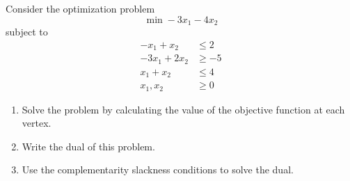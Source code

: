 
 Consider the optimization problem $$\min -3x_1 - 4x_2$$ subject to
\begin{align*}
-x_1+x_2 & \leq 2\\
-3x_1+2x_2 & \geq -5\\
x_1+x_2 & \leq 4\\
x_1,x_2 & \geq 0
\end{align*}
\begin{enumerate}
\item Solve the problem by calculating the  value of the objective
  function at each vertex.
\item Write the dual of this problem.
\item Use the complementarity slackness conditions to solve the dual.
\end{enumerate}


